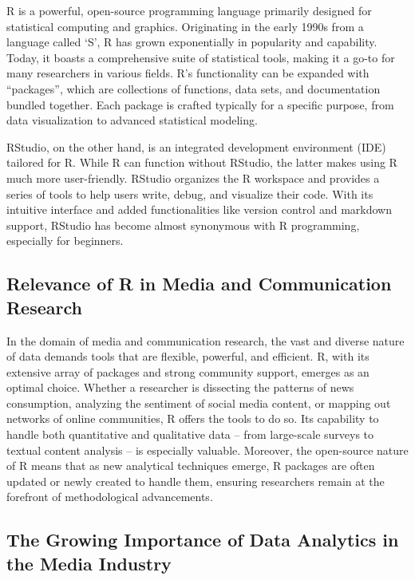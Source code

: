\documentclass[
  b5paper]{book}
\begin{document}
R is a powerful, open-source programming language primarily designed for statistical computing and graphics. Originating in the early 1990s from a language called `S', R has grown exponentially in popularity and capability. Today, it boasts a comprehensive suite of statistical tools, making it a go-to for many researchers in various fields. R's functionality can be expanded with ``packages'', which are collections of functions, data sets, and documentation bundled together. Each package is crafted typically for a specific purpose, from data visualization to advanced statistical modeling.

RStudio, on the other hand, is an integrated development environment (IDE) tailored for R. While R can function without RStudio, the latter makes using R much more user-friendly. RStudio organizes the R workspace and provides a series of tools to help users write, debug, and visualize their code. With its intuitive interface and added functionalities like version control and markdown support, RStudio has become almost synonymous with R programming, especially for beginners.

\hypertarget{relevance-of-r-in-media-and-communication-research}{%
\subsection*{Relevance of R in Media and Communication Research}\label{relevance-of-r-in-media-and-communication-research}}

In the domain of media and communication research, the vast and diverse nature of data demands tools that are flexible, powerful, and efficient. R, with its extensive array of packages and strong community support, emerges as an optimal choice. Whether a researcher is dissecting the patterns of news consumption, analyzing the sentiment of social media content, or mapping out networks of online communities, R offers the tools to do so. Its capability to handle both quantitative and qualitative data -- from large-scale surveys to textual content analysis -- is especially valuable. Moreover, the open-source nature of R means that as new analytical techniques emerge, R packages are often updated or newly created to handle them, ensuring researchers remain at the forefront of methodological advancements.

\hypertarget{the-growing-importance-of-data-analytics-in-the-media-industry}{%
\subsection*{The Growing Importance of Data Analytics in the Media Industry}\label{the-growing-importance-of-data-analytics-in-the-media-industry}}
\end{document}
